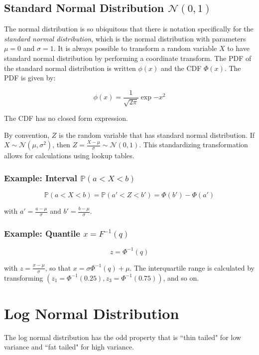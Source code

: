 \subsection{Standard Normal Distribution $\mathscr{N}(0,1)$ }

The normal distribution is so ubiquitous that there is notation specifically for the \textit{standard normal distribution}, which is the normal distribution with parameters $\mu = 0$ and $\sigma = 1$. It is always possible to transform a random variable $X$ to have standard normal distribution by performing a coordinate transform. The PDF of the standard normal distribution is written $\phi(x)$ and the CDF $\Phi(x)$. The PDF is given by: 

\begin{equation}
\phi(x) = \frac{1}{\sqrt{2\pi}}\exp{-x^2}
\end{equation}

The CDF has no closed form expression. 

By convention, $Z$ is the random variable that has standard normal distribution. If $X \sim \mathscr{N}(\mu,\sigma^2)$, then $Z = \frac{X-\mu}{\sigma} \sim \mathscr{N}(0,1)$. This standardizing transformation allows for calculations using lookup tables. 

\subsubsection{Example: Interval $\mathbb{P}(a<X<b)$}

\begin{equation}
\mathbb{P}(a<X<b) =  \mathbb{P}(a' < Z < b') = \Phi(b') - \Phi(a')
\end{equation}

with $a' = \frac{a-\mu}{\sigma}$ and $b' = \frac{b-\mu}{\sigma}$.

\subsubsection{Example: Quantile $x = F^{-1}(q)$}

\begin{equation}
z = \Phi^{-1}(q)
\end{equation}

with $z = \frac{x-\mu}{\sigma}$, so that $x = \sigma \Phi^{-1}(q)+\mu$. The interquartile range is calculated by transforming $(z_{1}=\Phi^{-1}(0.25),z_{3}=\Phi^{-1}(0.75))$, and so on.


\section{Log Normal Distribution}
The log normal distribution has the odd property that is ``thin tailed" for low variance and ``fat tailed" for high variance.

